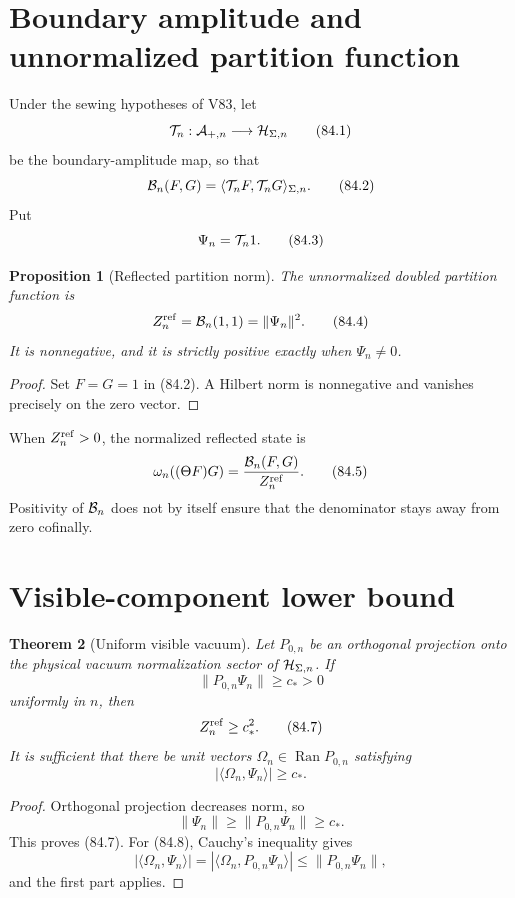 \documentclass[11pt]{article}
\newtheorem{theorem}{Theorem}[section]
\newtheorem{proposition}[theorem]{Proposition}
\theoremstyle{remark}
\begin{document}
\section{Boundary amplitude and unnormalized partition function}

Under the sewing hypotheses of V83, let
\[
 {\cal T}_n:{\cal A}_{+,n}\longrightarrow{\cal H}_{\Sigma,n}    \tag{84.1}
\]
be the boundary-amplitude map, so that
\[
 {\cal B}_n(F,G)
 =
 \langle{\cal T}_nF,{\cal T}_nG\rangle_{\Sigma,n}.     \tag{84.2}
\]
Put
\[
 \Psi_n={\cal T}_n1.                                  \tag{84.3}
\]

\begin{proposition}[Reflected partition norm]
\label{prop:v15v84-partition}
The unnormalized doubled partition function is
\[
 Z_n^{\rm ref}={\cal B}_n(1,1)=\|\Psi_n\|^2.           \tag{84.4}
\]
It is nonnegative, and it is strictly positive exactly when
\(\Psi_n\ne0\).
\end{proposition}

\begin{proof}
Set \(F=G=1\) in (84.2).  A Hilbert norm is nonnegative and
vanishes precisely on the zero vector.
\end{proof}

When \(Z_n^{\rm ref}>0\), the normalized reflected state is
\[
 \omega_n((\Theta F)G)
 =
 \frac{{\cal B}_n(F,G)}{Z_n^{\rm ref}}.                \tag{84.5}
\]
Positivity of \({\cal B}_n\) does not by itself ensure that the
denominator stays away from zero cofinally.

\section{Visible-component lower bound}

\begin{theorem}[Uniform visible vacuum]
\label{thm:v15v84-visible}
Let \(P_{0,n}\) be an orthogonal projection onto the physical
vacuum normalization sector of
\({\cal H}_{\Sigma,n}\).  If
\[
 \|P_{0,n}\Psi_n\|\geq c_*>0                          \tag{84.6}
\]
uniformly in \(n\), then
\[
 Z_n^{\rm ref}\geq c_*^2.                             \tag{84.7}
\]
It is sufficient that there be unit vectors
\(\Omega_n\in\operatorname{Ran}P_{0,n}\) satisfying
\[
 |\langle\Omega_n,\Psi_n\rangle|\geq c_*.             \tag{84.8}
\]
\end{theorem}

\begin{proof}
Orthogonal projection decreases norm, so
\[
 \|\Psi_n\|\geq\|P_{0,n}\Psi_n\|\geq c_*.
\]
This proves (84.7).  For (84.8), Cauchy's inequality gives
\[
 |\langle\Omega_n,\Psi_n\rangle|
 =
 |\langle\Omega_n,P_{0,n}\Psi_n\rangle|
 \leq\|P_{0,n}\Psi_n\|,
\]
and the first part applies.
\end{proof}
\end{document}
